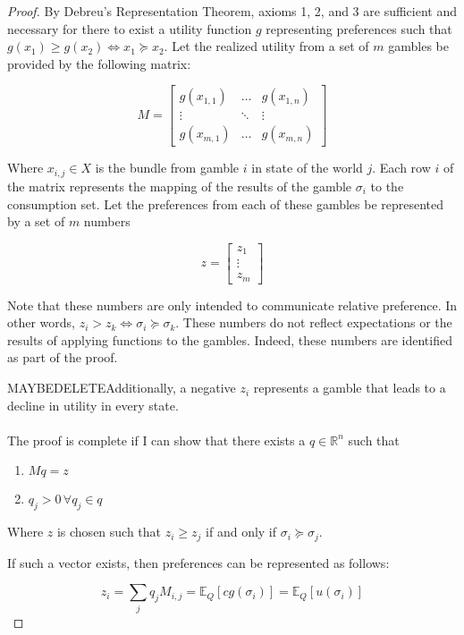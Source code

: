 \documentclass{article}
\begin{document}
\begin{proof}
By Debreu's Representation Theorem, axioms 1, 2, and 3 are sufficient and necessary for there to exist a utility function \(g\) representing preferences such that \(g(x_1)\geq g(x_2) \Leftrightarrow x_1 \succeq x_2 \).  Let the realized utility from a set of \(m\) gambles be provided by the following matrix:

\[M=\begin{bmatrix}
	g(x_{1, 1}) & \ldots & g(x_{1, n})\\
	\vdots & \ddots & \vdots \\
	g(x_{m, 1}) & \ldots & g(x_{m, n})
\end{bmatrix}
\]

Where \(x_{i, j} \in X\) is the bundle from gamble \(i\) in state of the world \(j\).  Each row  \(i\) of the matrix represents the mapping of the results of the gamble \(\sigma_i\) to the consumption set. Let the preferences from each of these gambles be represented by a set of \(m\) numbers

\[z=\begin{bmatrix}
z_1 \\ \vdots\\ z_m
\end{bmatrix}\]


Note that these numbers are only intended to communicate relative preference.  In other words, \(z_i > z_k \Leftrightarrow \sigma_i \succeq \sigma_k\).  These numbers do not reflect expectations or the results of applying functions to the gambles.  Indeed, these numbers are identified as part of the proof.

MAYBEDELETEAdditionally, a negative \(z_i\) represents a gamble that leads to a decline in utility in every state.   
\\
\\
The proof is complete if I can show that there exists a \(q \in \mathbb{R}^n\) such that 
\begin{enumerate}
	\item \(Mq=z\)
	\item \(q_j>0 \, \forall q_j \in q\)
\end{enumerate}
Where \(z\) is chosen such that \(z_i \geq z_j\) if and only if  \(\sigma_i \succeq \sigma_j\).

If such a vector exists, then preferences can be represented as follows:

\[z_i=\sum_j q_j M_{i, j} = \mathbb{E}_Q \left[ c g(\sigma_i) \right] =\mathbb{E}_Q\left[u(\sigma_i)\right] \]


\end{proof}
\end{document}

